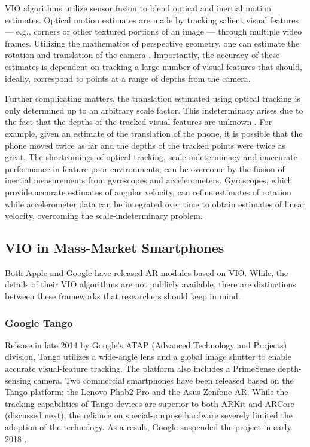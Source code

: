 \documentclass[chi_draft]{sigchi}
\begin{document}
VIO algorithms utilize sensor fusion to blend optical and inertial motion estimates.  Optical motion estimates are made by tracking salient visual features --- e.g., corners or other textured portions of an image --- through multiple video frames.  Utilizing the mathematics of perspective geometry, one can estimate the rotation and translation of the camera \cite{Hartley2004}.  Importantly, the accuracy of these estimates is dependent on tracking a large number of visual features that should, ideally, correspond to points at a range of depths from the camera.%

Further complicating matters, the translation estimated using optical tracking is only determined up to an arbitrary scale factor.  This indeterminacy arises due to the fact that the depths of the tracked visual features are unknown \cite{Hartley2004}.  For example, given an estimate of the translation of the phone, it is possible that the phone moved twice as far and the depths of the tracked points were twice as great.  The shortcomings of optical tracking, scale-indeterminacy and inaccurate performance in feature-poor environments, can be overcome by the fusion of inertial measurements from gyroscopes and accelerometers.  Gyroscopes, which provide accurate estimates of angular velocity, can refine estimates of rotation while accelerometer data can be integrated over time to obtain estimates of linear velocity, overcoming the scale-indeterminacy problem.

\subsection{VIO in Mass-Market Smartphones}
Both Apple and Google have released AR modules based on VIO.  While, the details of their VIO algorithms are not publicly available, there are distinctions between these frameworks that researchers should keep in mind.

\subsubsection{Google Tango}
Release in late 2014 by Google's ATAP (Advanced Technology and Projects) division, Tango utilizes a wide-angle lens and a global image shutter to enable accurate visual-feature tracking.  The platform also includes a PrimeSense depth-sensing camera.  Two commercial smartphones have been released based on the Tango platform: the Lenovo Phab2 Pro and the Asus Zenfone AR.  While the tracking capabilities of Tango devices are superior to both ARKit and ARCore (discussed next), the reliance on special-purpose hardware severely limited the adoption of the technology.  As a result, Google suspended the project in early 2018 \cite{tangoretired}.
\end{document}
